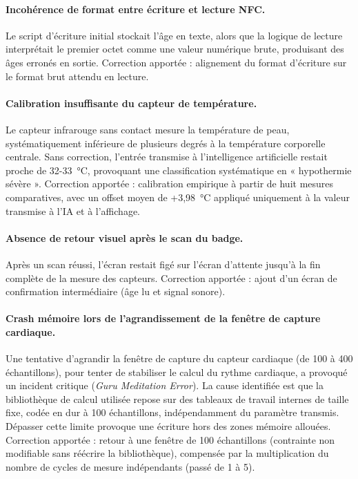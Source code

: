 \documentclass[12pt,a4paper]{report}
\begin{document}
\paragraph{Incohérence de format entre écriture et lecture NFC.} Le script d'écriture initial stockait l'âge en texte, alors que la logique de lecture interprétait le premier octet comme une valeur numérique brute, produisant des âges erronés en sortie. Correction apportée : alignement du format d'écriture sur le format brut attendu en lecture.

\paragraph{Calibration insuffisante du capteur de température.} Le capteur infrarouge sans contact mesure la température de peau, systématiquement inférieure de plusieurs degrés à la température corporelle centrale. Sans correction, l'entrée transmise à l'intelligence artificielle restait proche de 32-33~°C, provoquant une classification systématique en « hypothermie sévère ». Correction apportée : calibration empirique à partir de huit mesures comparatives, avec un offset moyen de +3,98~°C appliqué uniquement à la valeur transmise à l'IA et à l'affichage.

\paragraph{Absence de retour visuel après le scan du badge.} Après un scan réussi, l'écran restait figé sur l'écran d'attente jusqu'à la fin complète de la mesure des capteurs. Correction apportée : ajout d'un écran de confirmation intermédiaire (âge lu et signal sonore).

\paragraph{Crash mémoire lors de l'agrandissement de la fenêtre de capture cardiaque.} Une tentative d'agrandir la fenêtre de capture du capteur cardiaque (de 100 à 400 échantillons), pour tenter de stabiliser le calcul du rythme cardiaque, a provoqué un incident critique (\textit{Guru Meditation Error}). La cause identifiée est que la bibliothèque de calcul utilisée repose sur des tableaux de travail internes de taille fixe, codée en dur à 100 échantillons, indépendamment du paramètre transmis. Dépasser cette limite provoque une écriture hors des zones mémoire allouées. Correction apportée : retour à une fenêtre de 100 échantillons (contrainte non modifiable sans réécrire la bibliothèque), compensée par la multiplication du nombre de cycles de mesure indépendants (passé de 1 à 5).
\end{document}
